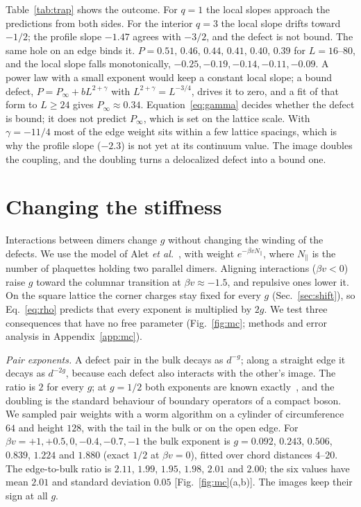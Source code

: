 \documentclass[aps,pre,twocolumn,superscriptaddress,nofootinbib,floatfix]{revtex4-2}
\begin{document}
Table~\ref{tab:trap} shows the outcome. For $q=1$ the local slopes approach the predictions from both sides. For the interior $q=3$ the local slope drifts toward $-1/2$; the profile slope $-1.47$ agrees with $-3/2$, and the defect is not bound. The same hole on an edge binds it. $P=0.51,\,0.46,\,0.44,\,0.41,\,0.40,\,0.39$ for $L=16$--$80$, and the local slope falls monotonically, $-0.25,-0.19,-0.14,-0.11,-0.09$. A power law with a small exponent would keep a constant local slope; a bound defect, $P=P_\infty+bL^{2+\gamma}$ with $L^{2+\gamma}=L^{-3/4}$, drives it to zero, and a fit of that form to $L\ge24$ gives $P_\infty\approx0.34$. Equation~\eqref{eq:gamma} decides whether the defect is bound; it does not predict $P_\infty$, which is set on the lattice scale. With $\gamma=-11/4$ most of the edge weight sits within a few lattice spacings, which is why the profile slope ($-2.3$) is not yet at its continuum value. The image doubles the coupling, and the doubling turns a delocalized defect into a bound one.

\section{Changing the stiffness}
\label{sec:g}
Interactions between dimers change $g$ without changing the winding of the defects. We use the model of Alet \emph{et al.}~\cite{Alet2005,Alet2006}, with weight $e^{-\beta vN_\parallel}$, where $N_\parallel$ is the number of plaquettes holding two parallel dimers. Aligning interactions ($\beta v<0$) raise $g$ toward the columnar transition at $\beta v\approx-1.5$, and repulsive ones lower it. On the square lattice the corner charges stay fixed for every $g$ (Sec.~\ref{sec:shift}), so Eq.~\eqref{eq:rho} predicts that every exponent is multiplied by $2g$. We test three consequences that have no free parameter (Fig.~\ref{fig:mc}; methods and error analysis in Appendix~\ref{app:mc}).

\emph{Pair exponents.} A defect pair in the bulk decays as $d^{-g}$; along a straight edge it decays as $d^{-2g}$, because each defect also interacts with the other's image. The ratio is $2$ for every $g$; at $g=1/2$ both exponents are known exactly~\cite{FisherStephenson1963,PriezzhevRuelle2008}, and the doubling is the standard behaviour of boundary operators of a compact boson. We sampled pair weights with a worm algorithm on a cylinder of circumference $64$ and height $128$, with the tail in the bulk or on the open edge. For $\beta v=+1,+0.5,0,-0.4,-0.7,-1$ the bulk exponent is $g=0.092$, $0.243$, $0.506$, $0.839$, $1.224$ and $1.880$ (exact $1/2$ at $\beta v=0$), fitted over chord distances $4$--$20$. The edge-to-bulk ratio is $2.11$, $1.99$, $1.95$, $1.98$, $2.01$ and $2.00$; the six values have mean $2.01$ and standard deviation $0.05$ [Fig.~\ref{fig:mc}(a,b)]. The images keep their sign at all $g$.
\end{document}
